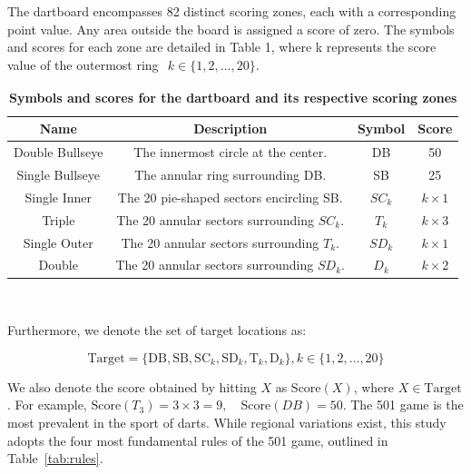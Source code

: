\documentclass[cjjs]{ipart}
\theoremstyle{plain}
\begin{document}
The dartboard encompasses 82 distinct scoring zones, each with a corresponding point value. Any area outside the board is assigned a score of zero. The symbols and scores for each zone are detailed in Table 1, where k represents the score value of the outermost ring $\begin{aligned}k \in \{1, 2, \dots, 20\}.\end{aligned}$
\begin{table}[h]
    \centering
    \begin{tabular}{|c|c|c|c|}
        \hline
        Name & Description & Symbol & Score \\
        \hline
        Double Bullseye & The innermost circle at the center. & DB & 50 \\
        \hline
        Single Bullseye & The annular ring surrounding DB. & SB & 25 \\
        \hline
        Single Inner & The 20 pie-shaped sectors encircling SB. & \( SC_k \) & \( k \times 1 \) \\
        \hline
        Triple & The 20 annular sectors surrounding \( SC_k \). & \( T_k \) & \( k \times 3 \) \\
        \hline
        Single Outer & The 20 annular sectors surrounding \( T_k \). & \( SD_k \) & \( k \times 1 \) \\
        \hline
        Double & The 20 annular sectors surrounding \( SD_k \). & \( D_k \) & \( k \times 2 \) \\
        \hline
    \end{tabular}\\[1em]
    \caption{\textbf{Symbols and scores for the dartboard and its respective scoring zones}}
\end{table}

Furthermore, we denote the set of target locations as:

\[
\text{Target} = \{ \text{DB}, \text{SB}, \text{SC}_k, \text{SD}_k, \text{T}_k, \text{D}_k \}, k \in \{1, 2, \dots, 20\}
\]


We also denote the score obtained by hitting \( X \) as \( \text{Score}(X) \), where \( X \in \text{Target} \).  
For example, 
$\text{Score}(T_3) = 3 \times 3 = 9, \quad \text{Score}(DB) = 50.$
The 501 game is the most prevalent in the sport of darts. While regional variations exist, this study adopts the four most fundamental rules of the 501 game, outlined in Table~\ref{tab:rules}.
\end{document}
